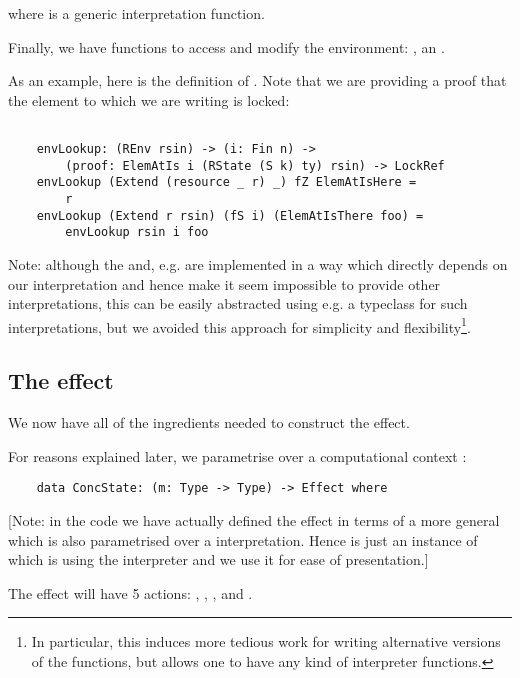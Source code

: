 where  is a generic interpretation function.

Finally, we have functions to access and modify the environment:
,  an .

As an example, here is the definition of . Note that we are
providing a proof that the element to which we are writing is locked:

\begin{BVerbatim}

    envLookup: (REnv rsin) -> (i: Fin n) ->
        (proof: ElemAtIs i (RState (S k) ty) rsin) -> LockRef
    envLookup (Extend (resource _ r) _) fZ ElemAtIsHere =
        r
    envLookup (Extend r rsin) (fS i) (ElemAtIsThere foo) =
        envLookup rsin i foo

\end{BVerbatim}

Note: although the  and, e.g.  are implemented in a
way which directly depends on our  interpretation and hence
make it seem impossible to provide other interpretations, this can be easily
abstracted using e.g. a typeclass for such interpretations, but we avoided this
approach for simplicity and flexibility\footnote{In particular, this induces more
tedious work for writing alternative versions of the  functions, but
allows one to have any kind of interpreter functions.}.

\subsection{The effect}

We now have all of the ingredients needed to construct the
 effect.

For reasons explained later, we parametrise  over a
computational context :

\begin{BVerbatim}
    data ConcState: (m: Type -> Type) -> Effect where
\end{BVerbatim}

[Note: in the code we have actually defined the effect in terms of a more
general  which is also parametrised over a 
interpretation. Hence  is just an instance of
 which is using the  interpreter and we use
it for ease of presentation.]

The effect will have 5 actions: , , ,
 and .

